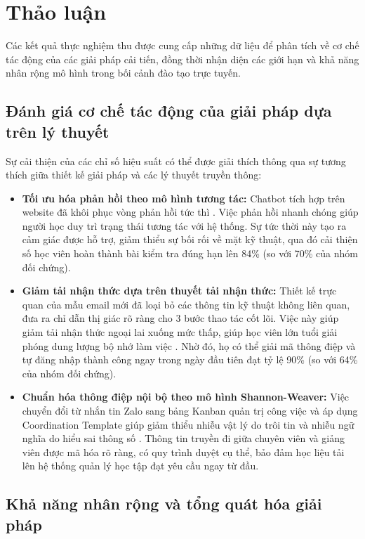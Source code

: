 \section{Thảo luận}

Các kết quả thực nghiệm thu được cung cấp những dữ liệu để phân tích về cơ chế tác động của các giải pháp cải tiến, đồng thời nhận diện các giới hạn và khả năng nhân rộng mô hình trong bối cảnh đào tạo trực tuyến.

\subsection{Đánh giá cơ chế tác động của giải pháp dựa trên lý thuyết}

Sự cải thiện của các chỉ số hiệu suất có thể được giải thích thông qua sự tương thích giữa thiết kế giải pháp và các lý thuyết truyền thông:
\begin{itemize}
    \item \textbf{Tối ưu hóa phản hồi theo mô hình tương tác:} Chatbot tích hợp trên website đã khôi phục vòng phản hồi tức thì \parencite{barnlund2008}. Việc phản hồi nhanh chóng giúp người học duy trì trạng thái tương tác với hệ thống. Sự tức thời này tạo ra cảm giác được hỗ trợ, giảm thiểu sự bối rối về mặt kỹ thuật, qua đó cải thiện số học viên hoàn thành bài kiểm tra đúng hạn lên 84\% (so với 70\% của nhóm đối chứng).
    \item \textbf{Giảm tải nhận thức dựa trên thuyết tải nhận thức:} Thiết kế trực quan của mẫu email mới đã loại bỏ các thông tin kỹ thuật không liên quan, đưa ra chỉ dẫn thị giác rõ ràng cho 3 bước thao tác cốt lõi. Việc này giúp giảm tải nhận thức ngoại lai xuống mức thấp, giúp học viên lớn tuổi giải phóng dung lượng bộ nhớ làm việc \parencite{sweller1988}. Nhờ đó, họ có thể giải mã thông điệp và tự đăng nhập thành công ngay trong ngày đầu tiên đạt tỷ lệ 90\% (so với 64\% của nhóm đối chứng).
    \item \textbf{Chuẩn hóa thông điệp nội bộ theo mô hình Shannon-Weaver:} Việc chuyển đổi từ nhắn tin Zalo sang bảng Kanban quản trị công việc và áp dụng Coordination Template giúp giảm thiểu nhiễu vật lý do trôi tin và nhiễu ngữ nghĩa do hiểu sai thông số \parencite{shannon1949}. Thông tin truyền đi giữa chuyên viên và giảng viên được mã hóa rõ ràng, có quy trình duyệt cụ thể, bảo đảm học liệu tải lên hệ thống quản lý học tập đạt yêu cầu ngay từ đầu.
\end{itemize}

\subsection{Khả năng nhân rộng và tổng quát hóa giải pháp}

